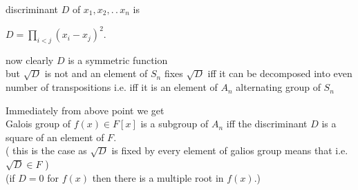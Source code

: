 \documentclass[11pt]{extarticle}
\newcommand{\ck}{.\,.\,}
\newcommand{\snote}[1]{{\footnotesize(#1)}}
\newcommand{\tbx}[2][]{
\begin{tcolorbox}[enhanced,breakable,size=small,colback=black!2!white,title={#1},arc is angular, arc=1.5mm,drop fuzzy shadow]
	#2
\end{tcolorbox}
}
\begin{document}
\begin{multicols}{2}
\tbx[Discriminant]{ discriminant $ D $ of $ x_1,x_2,\ck x_n $ is 
	\begin{center}
		$ D=\prod\limits_{i<j}(x_i-x_j)^2 .$
	\end{center} 
 now clearly $ D $ is a symmetric function\\
 but $ \sqrt{D} $ is not and an element of $ S_n $ fixes $ \sqrt{D} $ iff it can be decomposed into even number of transpositions i.e. iff it is an element of $ A_n $ alternating group of $ S_n $  }
 \tbx{ Immediately from above point we get \\
 Galois group of $ f(x)\in F[x] $ is a subgroup of $A_n $ iff the discriminant $ D $ is a square of an element of $ F. $ \\
 \snote{ this is the case as $ \sqrt{D} $ is fixed by every element of galios group means that i.e. $ \sqrt{D}\in F $ }  \\ \snote{if $ D=0 $ for $ f(x) $ then there is a multiple root in $ f(x) .$}}
 

\end{multicols}
\end{document}
